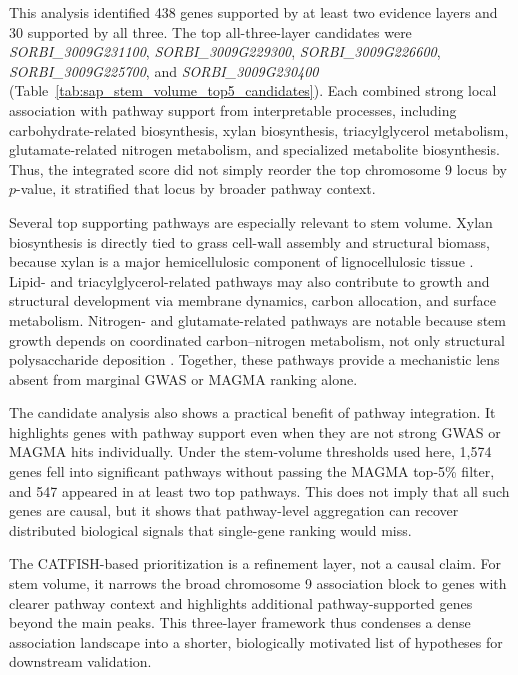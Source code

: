 \documentclass[unnumsec,webpdf,contemporary,large]{oup-authoring-template}%
\theoremstyle{thmstyleone}%
\theoremstyle{thmstyletwo}%
\theoremstyle{thmstylethree}%
\begin{document}
This analysis identified 438 genes supported by at least two evidence layers and 30 supported by all three. The top all-three-layer candidates were \textit{SORBI\_3009G231100}, \textit{SORBI\_3009G229300}, \textit{SORBI\_3009G226600}, \textit{SORBI\_3009G225700}, and \textit{SORBI\_3009G230400} (Table~\ref{tab:sap_stem_volume_top5_candidates}). Each combined strong local association with pathway support from interpretable processes, including carbohydrate-related biosynthesis, xylan biosynthesis, triacylglycerol metabolism, glutamate-related nitrogen metabolism, and specialized metabolite biosynthesis. Thus, the integrated score did not simply reorder the top chromosome 9 locus by $p$-value, it stratified that locus by broader pathway context.

Several top supporting pathways are especially relevant to stem volume. Xylan biosynthesis is directly tied to grass cell-wall assembly and structural biomass, because xylan is a major hemicellulosic component of lignocellulosic tissue \citep{Dodd2009,Basit2019}. Lipid- and triacylglycerol-related pathways may also contribute to growth and structural development via membrane dynamics, carbon allocation, and surface metabolism. Nitrogen- and glutamate-related pathways are notable because stem growth depends on coordinated carbon–nitrogen metabolism, not only structural polysaccharide deposition \citep{Souza2021NitrogenStem,Yu2022GLR}. Together, these pathways provide a mechanistic lens absent from marginal GWAS or MAGMA ranking alone.

The candidate analysis also shows a practical benefit of pathway integration. It highlights genes with pathway support even when they are not strong GWAS or MAGMA hits individually. Under the stem-volume thresholds used here, 1,574 genes fell into significant pathways without passing the MAGMA top-5\% filter, and 547 appeared in at least two top pathways. This does not imply that all such genes are causal, but it shows that pathway-level aggregation can recover distributed biological signals that single-gene ranking would miss.

The CATFISH-based prioritization is a refinement layer, not a causal claim. For stem volume, it narrows the broad chromosome 9 association block to genes with clearer pathway context and highlights additional pathway-supported genes beyond the main peaks. This three-layer framework thus condenses a dense association landscape into a shorter, biologically motivated list of hypotheses for downstream validation.
\end{document}
